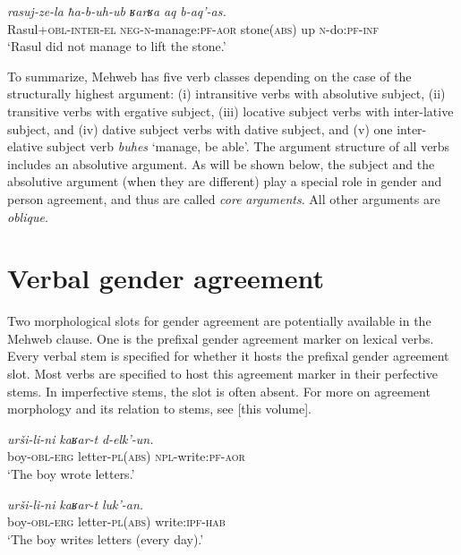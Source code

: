 ﻿\documentclass[output=paper]{langsci/langscibook}
\begin{document}
\ex \label{ex:7:36} %
\gll \emph{rasuj-ze-la} \emph{ħa-b-uh-ub} \emph{ʁarʁa} \emph{aq} \emph{b-aq'-as.}\\
Rasul+\textsc{obl}-\textsc{inter}-\textsc{el} \textsc{neg}-\textsc{n}-manage:\textsc{pf}-\textsc{aor} stone(\textsc{abs}) up \textsc{n}-do:\textsc{pf}-\textsc{inf}\\
\glt `Rasul did not manage to lift the stone.'
\z

To summarize, Mehweb has five verb classes depending on the case of
the structurally highest argument: (i) intransitive verbs with
absolutive subject, (ii) transitive verbs with ergative subject, (iii)
locative subject verbs with inter-lative subject, and (iv) dative
subject verbs with dative subject, and (v) one inter-elative subject
verb \emph{buhes} `manage, be able'. The argument structure of all verbs
includes an absolutive argument. As will be shown below, the subject and
the absolutive argument (when they are different) play a special role in
gender and person agreement, and thus are called \emph{core} \emph{arguments}.
All other arguments are \emph{oblique}.

\section{Verbal gender agreement}\label{Verbal-gender-agreement}

Two morphological slots for gender agreement are potentially available
in the Mehweb clause. One is the prefixal gender agreement marker on
lexical verbs. Every verbal stem is specified for whether it hosts the
prefixal gender agreement slot. Most verbs are specified to host this
agreement marker in their perfective stems. In imperfective stems, the
slot is often absent. For more on agreement morphology and its relation
to stems, see \citet{daniel2019} [this volume].

\ea \label{ex:7:37} %
\ea %
\gll \emph{urši-li-ni} \emph{kaʁar-t} \emph{d-elk'-un.}\\
boy-\textsc{obl}-\textsc{erg} letter-\textsc{pl}(\textsc{abs}) \textsc{npl}-write:\textsc{pf}-\textsc{aor}\\
\glt `The boy wrote letters.'

\ex %
\gll \emph{urši-li-ni} \emph{kaʁar-t} \emph{luk'-an.}\\
boy-\textsc{obl}-\textsc{erg} letter-\textsc{pl}(\textsc{abs}) write:\textsc{ipf}-\textsc{hab}\\
\glt `The boy writes letters (every day).'
\z
\z
\end{document}
